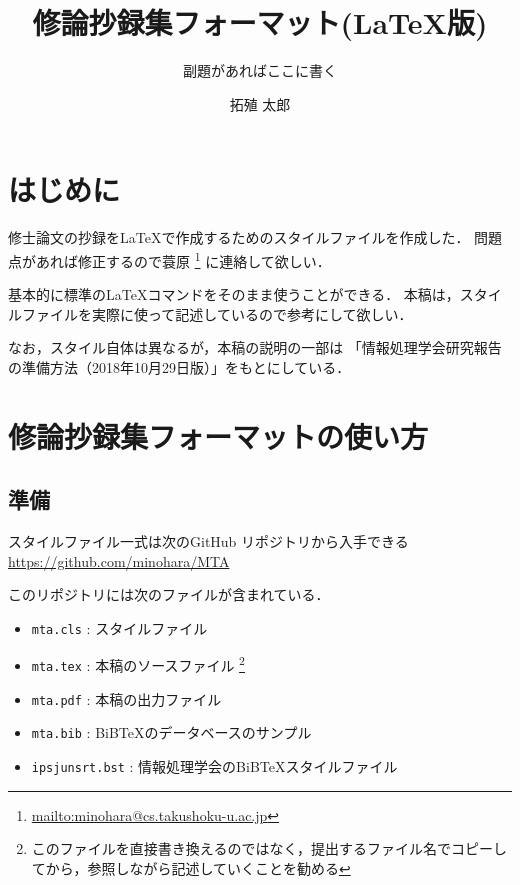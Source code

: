 \documentclass{mta}
\begin{document}
\title{修論抄録集フォーマット(\LaTeX{}版)}
\subtitle{副題があればここに書く} %


\author{拓殖 太郎}



\maketitle

\chapter{はじめに}

修士論文の抄録を\LaTeX{}\cite{latex}で作成するためのスタイルファイルを作成した．
問題点があれば修正するので蓑原
\footnote{\url{mailto:minohara@cs.takushoku-u.ac.jp}}
に連絡して欲しい．

基本的に標準の\LaTeX{}コマンドをそのまま使うことができる．
本稿は，スタイルファイルを実際に使って記述しているので参考にして欲しい．

なお，スタイル自体は異なるが，本稿の説明の一部は
「情報処理学会研究報告の準備方法（2018年10月29日版）」\cite{ipsjreport}をもとにしている．

\chapter{修論抄録集フォーマットの使い方}

\section{準備}

スタイルファイル一式は次のGitHub リポジトリから入手できる
\url{https://github.com/minohara/MTA}

このリポジトリには次のファイルが含まれている．

\begin{itemize}
    \item \verb|mta.cls| : スタイルファイル
    \item \verb|mta.tex| : 本稿のソースファイル%
    \footnote{このファイルを直接書き換えるのではなく，提出するファイル名でコピーしてから，参照しながら記述していくことを勧める}
    \item \verb|mta.pdf| : 本稿の出力ファイル
    \item \verb|mta.bib| : BiB\TeX{}のデータベースのサンプル
    \item \verb|ipsjunsrt.bst| : 情報処理学会のBiB\TeX{}スタイルファイル
\end{itemize}
\end{document}
